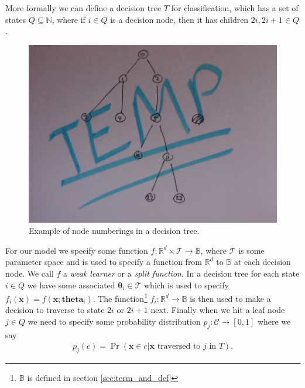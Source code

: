 \documentclass[12pt,twoside,notitlepage]{report}
\newcommand{\vc}[1]{\mathbf{#1}}
\newcommand{\cl}[1]{\mathcal{#1}}
\newcommand{\bb}[1]{\mathbb{#1}}
\begin{document}
            More formally we can define a decision tree $T$ for classification, which has a set of states $Q \subseteq 
            \bb{N}$, where if $i \in Q$ is a decision node, then it has children $2i, 2i+1 \in Q$. 

            \begin{figure}[H]
                \centering
                \includegraphics[scale=0.5]{tree_node_labels.jpeg}
                \caption{Example of node numberings in a decision tree.}
            \end{figure}

            For our model we specify some function $f:\bb{R}^d \times \cl{T} \rightarrow \bb{B}$, where $\cl{T}$ is some 
            parameter space and is used to specify a function from $\bb{R}^d$ to $\bb{B}$ at each decision node. We call 
            $f$ a \textit{weak learner} or a \textit{split function}. In a decision tree for each state $i \in Q$ we have 
            some associated $\vc{\theta}_i \in \cl{T}$ which is used to specify $f_i(\vc{x}) = f(\vc{x}; \vc{theta}_i)$. The 
            function\footnote{$\bb{B}$ is defined in section \ref{sec:term_and_def}} $f_i : \bb{R}^d \rightarrow \bb{B}$ 
            is then used to make a decision to traverse to state $2i$ or $2i+1$ next. Finally when we hit a leaf node 
            $j \in Q$ we need to specify some probability distribution $p_j:\cl{C} \rightarrow [0,1]$ where we say 
            \begin{align}
                p_j(c) = \Pr(\vc{x} \in c | \vc{x} \text{ traversed to } j \text{ in } T).
            \end{align}
\end{document}
